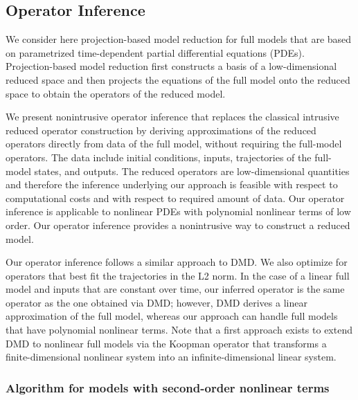 \documentclass{article}
\begin{document}
\vspace{1cm}

\subsection{Operator Inference}

\vspace{1cm}

We consider here projection-based model reduction for full models that are based on parametrized time-dependent partial differential equations (PDEs). Projection-based model reduction first constructs a basis of a low-dimensional reduced space and then projects the equations of the full model onto the reduced space to obtain the operators of the reduced model.

We present nonintrusive
operator inference that replaces the classical intrusive reduced operator construction by deriving approximations of the reduced operators directly from data of the full model, without requiring the full-model operators. The data include initial conditions, inputs, trajectories of the full-model states, and outputs. The reduced operators are low-dimensional quantities and therefore the inference underlying our approach is feasible with respect to computational costs and with respect to required amount of data. Our operator inference is applicable to nonlinear PDEs with polynomial nonlinear terms of low order. Our operator inference provides a nonintrusive way to construct a reduced model.

Our operator inference follows a similar approach to DMD. We also optimize for operators that best fit the trajectories in the L2 norm. In the case of a linear full model and inputs that are constant over time, our inferred operator is the same operator as the one obtained via DMD; however, DMD derives a linear approximation of the full model, whereas our approach can handle full models that have polynomial nonlinear terms. Note that a first approach exists to extend DMD to nonlinear full models via the Koopman operator that transforms a finite-dimensional nonlinear system into an infinite-dimensional linear system.

\vspace{1cm}

\subsubsection*{Algorithm  for models with second-order nonlinear terms}
\end{document}
